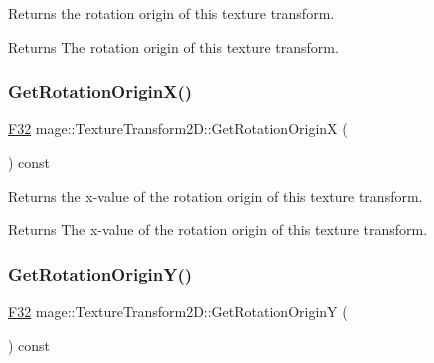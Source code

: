 Returns the rotation origin of this texture transform.

\begin{DoxyReturn}{Returns}
The rotation origin of this texture transform. 
\end{DoxyReturn}
\mbox{\label{classmage_1_1_texture_transform2_d_af6e95e897ef1d80bd7bb582feaeeba61}} 
\subsubsection{\texorpdfstring{Get\+Rotation\+Origin\+X()}{GetRotationOriginX()}}
{\footnotesize\ttfamily \mbox{\hyperlink{namespacemage_aa97e833b45f06d60a0a9c4fc22ae02c0}{F32}} mage\+::\+Texture\+Transform2\+D\+::\+Get\+Rotation\+OriginX (\begin{DoxyParamCaption}{ }\end{DoxyParamCaption}) const\hspace{0.3cm}{\ttfamily [noexcept]}}

Returns the x-\/value of the rotation origin of this texture transform.

\begin{DoxyReturn}{Returns}
The x-\/value of the rotation origin of this texture transform. 
\end{DoxyReturn}
\mbox{\label{classmage_1_1_texture_transform2_d_ab58530d2cf002b6061e997fb7c577358}} 
\subsubsection{\texorpdfstring{Get\+Rotation\+Origin\+Y()}{GetRotationOriginY()}}
{\footnotesize\ttfamily \mbox{\hyperlink{namespacemage_aa97e833b45f06d60a0a9c4fc22ae02c0}{F32}} mage\+::\+Texture\+Transform2\+D\+::\+Get\+Rotation\+OriginY (\begin{DoxyParamCaption}{ }\end{DoxyParamCaption}) const\hspace{0.3cm}{\ttfamily [noexcept]}}

